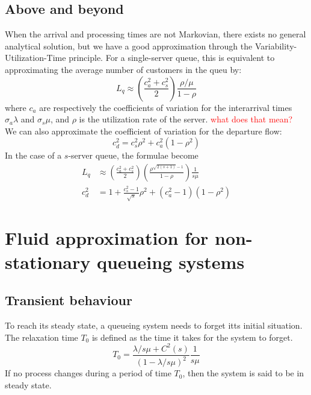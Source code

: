 \documentclass[12pt, openany]{report}
\theoremstyle{definition}
\begin{document}
\section{Above and beyond}
When the arrival and processing times are not Markovian, there exists no general analytical solution, but we have a good approximation through the Variability-Utilization-Time principle. For a single-server queue, this is equivalent to approximating the average number of customers in the queu by:
\begin{equation}
	L_q\approx \left(\frac{c_a^2+c_s^2}{2}\right)\frac{\rho/\mu}{1-\rho}
\end{equation}
where $c_a$ are respectively the coefficients of variation for the interarrival times $\sigma_a\lambda$ and $\sigma_s\mu$, and $\rho$ is the utilization rate of the server. \textcolor{red}{what does that mean?}\\
We can also approximate the coefficient of variation for the departure flow:
\begin{equation}
	c_d^2 = c_s^2 \rho^2 + c_a^2(1-\rho^2)
\end{equation}
In the case of a $s$-server queue, the formulae become 
\begin{equation}
	\begin{aligned}
		L_q&\approx \left(\frac{c_a^2+c_s^2}{2}\right)\left(\frac{\rho^{\sqrt{2(s+1)}-1}}{1-\rho}\right)\frac{1}{s\mu}\\
		c_d^2 &= 1+\frac{c_s^2-1}{\sqrt{s}}\rho^2 + (c_a^2-1)(1-\rho^2)
	\end{aligned}
\end{equation}
\chapter{Fluid approximation for non-stationary queueing systems}
\section{Transient behaviour}
To reach its steady state, a queueing system needs to forget itts initial situation. The relaxation time $T_0$ is defined as the time it takes for the system to forget.
\begin{equation}
	T_0 = \frac{\lambda/s\mu + C^2(s)}{(1-\lambda/s\mu)^2}\frac{1}{s\mu}
\end{equation}
If no process changes during a period of time $T_0$, then the system is said to be in steady state.\\
\end{document}
